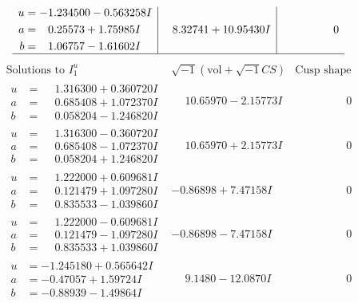 \documentclass[1p]{elsarticle_modified}
\theoremstyle{definition}
\newcommand{\I}{\sqrt{-1}}
\begin{document}
$$\begin{array}{c|c|c}
\begin{aligned}
u &= -1.234500 - 0.563258 I \\
a &= \phantom{-}0.25573 + 1.75985 I \\
b &= \phantom{-}1.06757 - 1.61602 I\end{aligned}
 & \phantom{-}8.32741 + 10.95430 I & \phantom{-0.000000 } 0\\
 \hline 
 \end{array}$$\newpage$$\begin{array}{c|c|c}  
\text{Solutions to }I^u_{1}& \I (\text{vol} + \sqrt{-1}CS) & \text{Cusp shape}\\
 \hline 
\begin{aligned}
u &= \phantom{-}1.316300 + 0.360720 I \\
a &= \phantom{-}0.685408 + 1.072370 I \\
b &= \phantom{-}0.058204 - 1.246820 I\end{aligned}
 & \phantom{-}10.65970 - 2.15773 I & \phantom{-0.000000 } 0 \\ \hline\begin{aligned}
u &= \phantom{-}1.316300 - 0.360720 I \\
a &= \phantom{-}0.685408 - 1.072370 I \\
b &= \phantom{-}0.058204 + 1.246820 I\end{aligned}
 & \phantom{-}10.65970 + 2.15773 I & \phantom{-0.000000 } 0 \\ \hline\begin{aligned}
u &= \phantom{-}1.222000 + 0.609681 I \\
a &= \phantom{-}0.121479 + 1.097280 I \\
b &= \phantom{-}0.835533 - 1.039860 I\end{aligned}
 & -0.86898 + 7.47158 I & \phantom{-0.000000 } 0 \\ \hline\begin{aligned}
u &= \phantom{-}1.222000 - 0.609681 I \\
a &= \phantom{-}0.121479 - 1.097280 I \\
b &= \phantom{-}0.835533 + 1.039860 I\end{aligned}
 & -0.86898 - 7.47158 I & \phantom{-0.000000 } 0 \\ \hline\begin{aligned}
u &= -1.245180 + 0.565642 I \\
a &= -0.47057 + 1.59724 I \\
b &= -0.88939 - 1.49864 I\end{aligned}
 & \phantom{-}9.1480 - 12.0870 I & \phantom{-0.000000 } 0 \\ \hline\begin{aligned}

\end{aligned}
\end{array}$$
\end{document}
